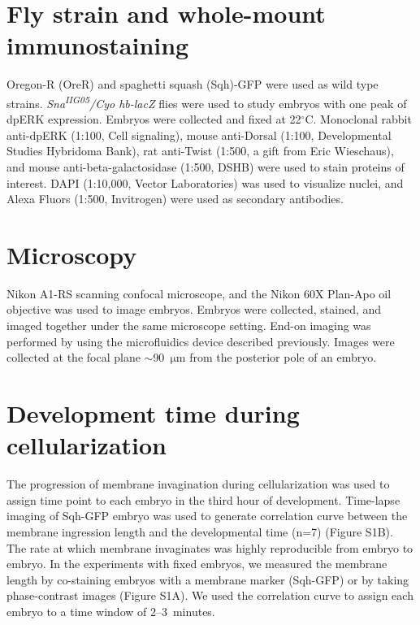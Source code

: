 \documentclass{pnastwo}
\begin{document}
\begin{article}
\begin{materials}
\section{Fly strain and whole-mount immunostaining}
%
Oregon-R (OreR) and spaghetti squash (Sqh)-GFP were used as wild type strains. 
%
{\it Sna\textsuperscript{\it IIG05}/Cyo hb-lacZ} flies were used to study embryos with one peak of dpERK expression.  
%
Embryos were collected and fixed at 22$^\circ$C. 
%
Monoclonal rabbit anti-dpERK (1:100, Cell signaling), mouse anti-Dorsal (1:100, Developmental Studies Hybridoma Bank), rat anti-Twist (1:500, a gift from Eric Wieschaus), and mouse anti-beta-galactosidase (1:500, DSHB) were used to stain proteins of interest. DAPI (1:10,000, Vector Laboratories) was used to visualize nuclei, and Alexa Fluors (1:500, Invitrogen) were used as secondary antibodies. 

\section{Microscopy}
%
Nikon A1-RS scanning confocal microscope, and the Nikon 60X Plan-Apo oil objective was used to image embryos. Embryos were collected, stained, and imaged together under the same microscope setting. End-on imaging was performed by using the microfluidics device described previously. Images were collected at the focal plane $\sim$90~$\mathrm{\mu m}$ from the posterior pole of an embryo. 

\section{Development time during cellularization} 
%
The progression of membrane invagination during cellularization was used to assign time point to each embryo in the third hour of development. Time-lapse imaging of Sqh-GFP embryo was used to generate correlation curve between the membrane ingression length and the developmental time (n=7) (Figure S1B). The rate at which membrane invaginates was highly reproducible from embryo to embryo. In the experiments with fixed embryos, we measured the membrane length by co-staining embryos with a membrane marker (Sqh-GFP) or by taking phase-contrast images (Figure S1A). We used the correlation curve to assign each embryo to a time window of 2--3~minutes. 

\end{materials}





\end{article}
\end{document}
